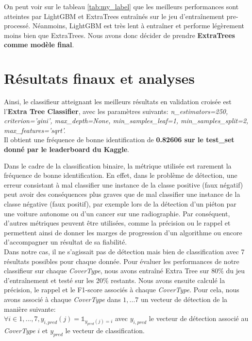 \documentclass{article}
\begin{document}
\newpage

On peut voir sur le tableau \ref{tab:my_label} que les meilleurs performances sont atteintes par LightGBM et ExtraTrees entraînés sur le jeu d'entraînement pre-processé. Néanmoins, LightGBM est très lent à entraîner et performe légèrement moins bien que ExtraTrees. Nous avons donc décider de prendre \textbf{ExtraTrees comme modèle final}. 



\section{Résultats finaux et analyses}

Ainsi, le classifieur atteignant les meilleurs résultats en validation croisée est l'\textbf{Extra Tree Classifier}, avec les paramètres suivants:  \textit{n\_estimators=250, criterion='gini', max\_depth=None, min\_samples\_leaf=1, min\_samples\_split=2, max\_features='sqrt'. } \\


Il obtient une fréquence de bonne identification de \textbf{0.82606 sur le test\_set donné par le leaderboard du Kaggle}. 


Dans le cadre de la classification binaire, la métrique utilisée est rarement la fréquence de bonne identification. En effet, dans le problème de détection, une erreur consistant à mal classifier une instance de la classe positive (faux négatif) peut avoir des conséquences plus graves que de mal classifier une instance de la classe négative (faux positif), par exemple lors de la détection d'un piéton par une voiture autonome ou d'un cancer sur une radiographie. Par conséquent, d'autres métriques peuvent être utilisées, comme la précision ou le rappel et permettent ainsi de donner les marges de progression d'un algorithme ou encore d'accompagner un résultat de sa fiabilité. \\

Dans notre cas, il ne s'agissait pas de détection mais bien de classification avec 7 résultats possibles pour chaque donnée. Pour évaluer les performances de notre classifieur sur chaque \textit{CoverType}, nous avons entraîné Extra Tree sur 80\% du jeu d'entraînement et testé sur les 20\% restants. Nous avons ensuite calculé la précision, le rappel et le F1-score associés à chaque \textit{CoverType}. Pour cela, nous avons associé à chaque \textit{CoverType} dans ${1, ... 7 } $ un vecteur de détection de la manière suivante: \\
$ \forall i \in {1, ..., 7}, y_{i, pred}(j)= \mathbb{1}_{y_{pred}(j)=i}$ avec $y_{i, pred}$ le vecteur de détection associé au \textit{CoverType} $i$ et $y_{pred}$ le vecteur de classification. 
\end{document}
